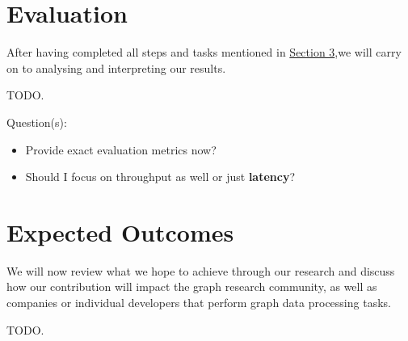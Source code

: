 \documentclass[a4paper,11pt]{article}
\begin{document}
\section{Evaluation} \label{evaluation}

\par After having completed all steps and tasks mentioned in \hyperref[methodology]{Section 3},we will carry on to analysing and interpreting our results.

\medskip

\par TODO.

\medskip

\par Question(s): 

\begin{itemize}
	
	\item Provide exact evaluation metrics now?
	\item Should I focus on throughput as well or just \textbf{latency}?	
	
\end{itemize}


\section{Expected Outcomes} \label{outcomes}

\par We will now review what we hope to achieve through our research and discuss how our contribution will impact the graph research community, as well as companies or individual developers that perform graph data processing tasks.

\medskip

\par TODO.


\end{document}
